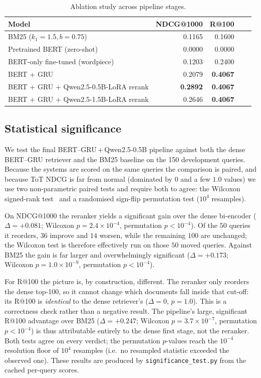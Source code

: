 \documentclass[conference]{IEEEtran}
\begin{document}
\begin{table}[t]
\centering
\caption{Ablation study across pipeline stages.}
\label{tab:ablation}
\begin{tabular}{lrrrr}
\toprule
Model & NDCG@1000 & R@100  \\
\midrule
BM25 ($k_1{=}1.5, b{=}0.75$)       & 0.1165 & 0.1600 \\
Pretrained BERT (zero-shot)        & 0.0000 & 0.0000 \\
BERT-only fine-tuned (wordpiece)   & 0.1203 & 0.2400 \\
BERT + GRU                         & 0.2079 & \textbf{0.4067} \\
BERT + GRU + Qwen2.5-0.5B-LoRA rerank   & \textbf{0.2892} & \textbf{0.4067} \\
BERT + GRU + Qwen2.5-1.5B-LoRA rerank   & 0.2646 & \textbf{0.4067} \\
\bottomrule
\end{tabular}
\end{table}

\subsection{Statistical significance}
\label{sec:sig}
We test the final BERT--GRU\,+\,Qwen2.5-0.5B pipeline against both the dense
BERT--GRU retriever and the BM25 baseline on the 150 development queries.
Because the systems are scored on the same queries the comparison is paired,
and because ToT NDCG is far from normal (dominated by $0$ and a few $1.0$
values) we use two non-parametric paired tests and require both to agree:
the Wilcoxon signed-rank test~\cite{wilcoxon1945} and a randomised sign-flip
permutation test ($10^{4}$ resamples).

On NDCG@1000 the reranker yields a significant gain over the dense
bi-encoder ($\Delta{=}{+}0.081$; Wilcoxon $p{=}2.4{\times}10^{-4}$,
permutation $p{<}10^{-4}$). Of the $50$ queries it reorders, $36$ improve
and $14$ worsen, while the remaining $100$ are unchanged; the Wilcoxon test
is therefore effectively run on those $50$ moved queries. Against BM25 the
gain is far larger and overwhelmingly significant
($\Delta{=}{+}0.173$; Wilcoxon $p{=}1.0{\times}10^{-9}$,
permutation $p{<}10^{-4}$).

For R@100 the picture is, by construction, different. The reranker only
reorders the dense top-100, so it cannot change which documents fall inside
that cut-off: its R@100 is \emph{identical} to the dense retriever's
($\Delta{=}0$, $p{=}1.0$). This is a correctness check rather than a negative
result. The pipeline's large, significant R@100 advantage over BM25
($\Delta{=}{+}0.247$; Wilcoxon $p{=}3.7{\times}10^{-7}$,
permutation $p{<}10^{-4}$) is thus attributable entirely to the dense first
stage, not the reranker. Both tests agree on every verdict; the permutation
$p$-values reach the $10^{-4}$ resolution floor of $10^{4}$ resamples (i.e.\
no resampled statistic exceeded the observed one). These results are produced
by \texttt{significance\_test.py} from the cached per-query scores.
\end{document}
